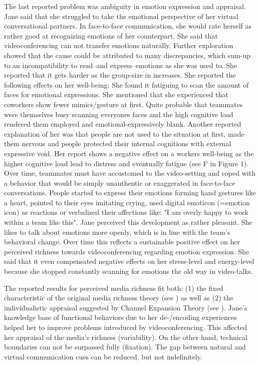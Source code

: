 \documentclass[man]{apa7}
\begin{document}
The last reported problem was ambiguity in emotion expression and appraisal. Jane said that she struggled to take the emotional perspective of her virtual conversational partners. In face-to-face communication, she would rate herself as rather good at recognizing emotions of her counterpart. She said that videoconferencing can not transfer emotions naturally. Further exploration showed that the cause could be attributed to many discrepancies, which sum-up to an incompatibility to read–and express–emotions as she was used to. She reported that it gets harder as the group-size in increases. She reported the following effects on her well-being: She found it fatiguing to scan the amount of faces for emotional expressions. She mentioned that she experienced that coworkers show fewer mimics/gesture at first. Quite probable that teammates were themselves busy scanning everyones faces and the high cognitive load rendered them employed and emotional-expressively blank. Another reported explanation of her was that people are not used to the situation at first, made them nervous and people protected their internal cognitions with external expressive void. Her report shows a negative effect on a workers well-being as the higher cognitive load lead to distress and eventually fatigue (see F in Figure 1). Over time, teammates must have accustomed to the video-setting and coped with a behavior that would be simply unauthentic or exaggerated in face-to-face conversations. People started to express their emotions forming hand gestures like a heart, pointed to their eyes imitating crying, used digital emoticon (=emotion icon) as reactions or verbalized their affections like: "I am overly happy to work within a team like this". Jane perceived this development as rather pleasant. She likes to talk about emotions more openly, which is in line with the team's behavioral change. Over time this reflects a sustainable positive effect on her perceived richness towards videoconferencing regarding emotion expression. She said that it even compensated negative effects on her stress-level and energy-level because she stopped constantly scanning for emotions the old way in video-talks.

The reported results for perceived media richness fit both: (1) the fixed characteristic of the original media richness theory (see \cite{daft1983information}) as well as (2) the individualistic appraisal suggested by Channel Expansion Theory (see \cite{Carlson1999}). Jane's knowledge base of functional behaviors due to her de-/encoding experiences helped her to improve problems introduced by videoconferencing. This affected her appraisal of the media's richness (variability). On the other hand, technical boundaries can not be surpassed fully (fixation). The gap between natural and virtual communication cues can be reduced, but not indefinitely.
\end{document}
